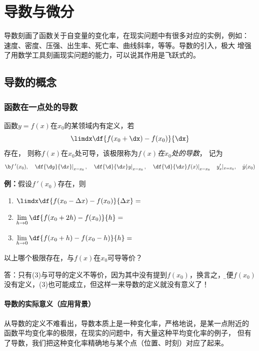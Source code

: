 \setcounter{chapter}{1}

\chapter{导数与微分}

导数刻画了函数关于自变量的变化率，在现实问题中有很多对应的实例，例如：
速度、密度、压强、出生率、死亡率、曲线斜率，等等。导数的引入，极大
增强了用数学工具刻画现实问题的能力，可以说其作用是飞跃式的。

\section{导数的概念}

\subsection{函数在一点处的导数}

函数$y=f(x)$在$x_0$的某领域内有定义，若
$$\limdx\df{f(x_0+\dx)-f(x_0)}{\dx}$$
存在， 则称{$f(x)$在$x_0$处可导}，该极限称为{\it $f(x)$在$x_0$处的导数}， 记为
$${\b f\,'(x_0),\quad \left.\df{\d y}{\d x}\right|_{x=x_0},\quad\left.\df{\d
}{\d x}y\right|_{x=x_0},\quad \left.\df{\d }{\d x}f(x)\right|_{x=x_0}\quad
y'_x|_{x=x_0},\quad \dot{y}(x_0)}$$

{\bf 例：}假设$f\,'(x_0)$存在，则
\begin{enumerate}[(1)]
  \setlength{\itemindent}{1cm}
  \item $\limdx\df{f(x_0-\Delta x)-f(x_0)}{\Delta
  x}=$ \underline{\quad} 
  \item $\lim\limits_{h\to 0}\df{f(x_0+2h)-f(x_0)}{h}=$
   \underline{\quad} 
  \item $\lim\limits_{h\to 0}\df{f(x_0+h)-f(x_0-h)}{h}=$ 
  \underline{\quad}
\end{enumerate}
以上哪个极限存在，与$f(x)$在$x_0$可导等价？

答：只有(3)与可导的定义不等价，因为其中没有提到$f(x_0)$，换言之，{\b 即便$f(x_0)$
没有定义，(3)也可能成立，但这样一来导数的定义就没有意义了！}

\subsubsection{导数的实际意义（应用背景）}

从导数的定义不难看出，导数本质上是一种变化率，严格地说，是某一点附近的
函数平均变化率的极限，在现实的问题中，有大量这种平均变化率的例子，
但有了导数，我们把这种变化率精确地与某个点（位置、时刻）对应了起来。

